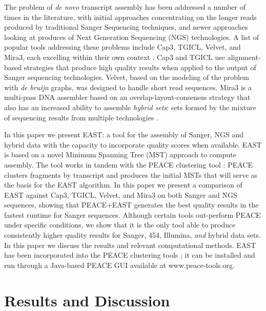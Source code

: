 \documentclass[10pt]{bmc_article}
\newcommand{\peace} {{\small PEACE}}
\newcommand{\capthree} {{\small Cap3}}
\newcommand{\tgicl} {{\small TGICL}}
\newcommand{\east} {{\small EAST}}
\newcommand{\velvet}{{\small Velvet}}
\newcommand{\mira}{{\small Mira3}}
\newcommand{\peast}{{\small PEACE+EAST}}
\newenvironment{bmcformat}{\begin{raggedright}\baselineskip20pt\sloppy\setboolean{publ}{false}}{\end{raggedright}\baselineskip20pt\sloppy}
\begin{document}
\begin{bmcformat}
\vspace{3mm}

The problem of {\it de novo} transcript assembly has been addressed a
number of times in the literature, with initial approaches
concentrating on the longer reads produced by traditional Sanger
Sequencing techniques, and newer approaches looking at produces of
Next Generation Sequencing (NGS) technologies.  A list of popular
tools addressing these problems include \capthree, \tgicl, \velvet,
and \mira, each excelling within their own context
\cite{Huang99,Pertea03,Chevreux04,Zerbino08}.  \capthree\/ and
\tgicl\/ use alignment-based strategies that produce high quality
results when applied to the output of Sanger sequencing technologies.
\velvet, based on the modeling of the problem with {\it de bruijn}
graphs, was designed to handle short read sequences.  \mira\/ is a
multi-pass DNA assembler based on an overlap-layout-consensus strategy
that also has an increased ability to assemble {\it hybrid sets}: sets
formed by the mixture of sequencing results from multiple technologies
\cite{MiraWeb}.

\vspace{3mm}

In this paper we present \east: a tool for the assembly of
Sanger, NGS and hybrid data with the capacity to incorporate quality
scores when available.  \east\/ is based on a novel Minimum Spanning
Tree (MST) approach to compute assembly.  The tool works in tandem
with the \peace\/ clustering tool \cite{Rao10}: \peace\/ clusters
fragments by transcript and produces the initial MSTs that will serve
as the basis for the \east\/ algorithm.  In this paper we present a
comparison of \east\/ against \capthree, \tgicl, \velvet, and
\mira\/ on both Sanger and NGS sequences, showing that \peast\/
generates the best quality results in the fastest runtime for Sanger
sequences.  Although certain tools out-perform \peace\/ under
specific conditions, we show that it is the only tool able to produce consistently
higher quality results for Sanger, 454, Illumina, {\it and} hybrid
data sets.  In this paper we discuss the results and relevant
computational methods.  \east\/ has been incorporated into the
\peace\/ clustering tools \cite{Rao10}; it can be installed
and run through a Java-based PEACE GUI available at
www.peace-tools.org.

 
\section*{Results and Discussion}


\end{bmcformat}
\end{document}
